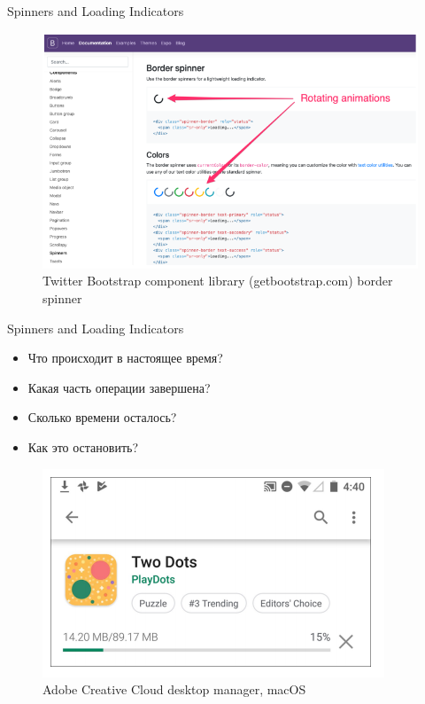 \documentclass{beamer}
\begin{document}
\begin{frame}[t]{Spinners and Loading Indicators}
	\begin{figure}[h]
		\centering
		\includegraphics[scale=0.6]{images/lec08-pic20.png}
		\caption{Twitter Bootstrap component library (getbootstrap.com) border spinner}
	\end{figure}
\end{frame}

\begin{frame}[t]{Spinners and Loading Indicators}
	\begin{itemize}
		\item Что происходит в настоящее время?
		\item Какая часть операции завершена?
		\item Сколько времени осталось?
		\item Как это остановить?
	\end{itemize}

	\begin{figure}[h]
		\centering
		\includegraphics[scale=0.5]{images/lec08-pic21.png}
		\caption{Adobe Creative Cloud desktop manager, macOS}
	\end{figure}
\end{frame}
\end{document}
